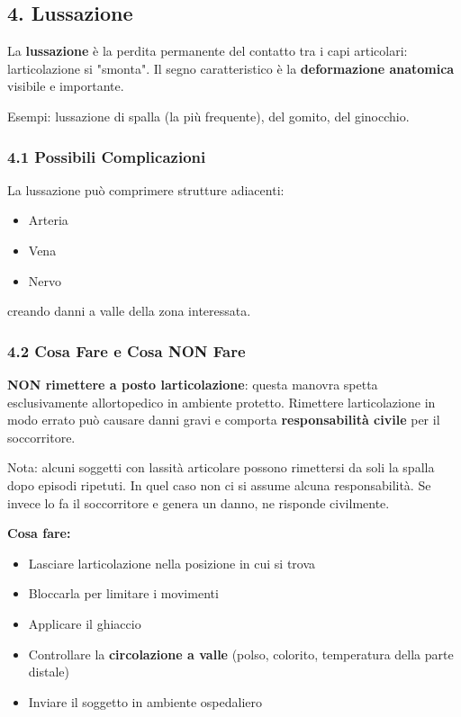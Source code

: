 \documentclass[a4paper,11pt]{article}
\providecommand{\tightlist}{%
  \setlength{\itemsep}{0pt}\setlength{\parskip}{0pt}}
\begin{document}
\subsection{4. Lussazione}\label{lussazione}

La \textbf{lussazione} è la perdita permanente del contatto tra i capi
articolari: l\textquotesingle articolazione si "smonta". Il segno
caratteristico è la \textbf{deformazione anatomica} visibile e
importante.

Esempi: lussazione di spalla (la più frequente), del gomito, del
ginocchio.

\subsubsection{4.1 Possibili
      Complicazioni}\label{possibili-complicazioni}

La lussazione può comprimere strutture adiacenti:

\begin{itemize}
      \tightlist
      \item
            Arteria
      \item
            Vena
      \item
            Nervo
\end{itemize}

creando danni a valle della zona interessata.

\subsubsection{4.2 Cosa Fare e Cosa NON
      Fare}\label{cosa-fare-e-cosa-non-fare}

\textbf{NON rimettere a posto l\textquotesingle articolazione}: questa
manovra spetta esclusivamente all\textquotesingle ortopedico in ambiente
protetto. Rimettere l\textquotesingle articolazione in modo errato può
causare danni gravi e comporta \textbf{responsabilità civile} per il
soccorritore.

Nota: alcuni soggetti con lassità articolare possono rimettersi da soli
la spalla dopo episodi ripetuti. In quel caso non ci si assume alcuna
responsabilità. Se invece lo fa il soccorritore e genera un danno, ne
risponde civilmente.

\textbf{Cosa fare:}

\begin{itemize}
      \tightlist
      \item
            Lasciare l\textquotesingle articolazione nella posizione in cui si
            trova
      \item
            Bloccarla per limitare i movimenti
      \item
            Applicare il ghiaccio
      \item
            Controllare la \textbf{circolazione a valle} (polso, colorito,
            temperatura della parte distale)
      \item
            Inviare il soggetto in ambiente ospedaliero
\end{itemize}
\end{document}
